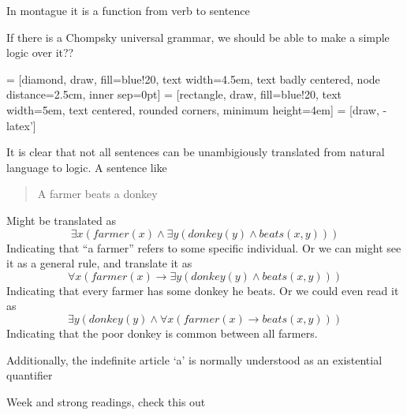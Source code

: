 \documentclass[12pt]{article}
\begin{document}
In montague it is a function from verb to sentence

If there is a Chompsky universal grammar, we should be able to make a simple logic over it??

 = [diamond, draw, fill=blue!20,
    text width=4.5em, text badly centered, node distance=2.5cm, inner sep=0pt]
 = [rectangle, draw, fill=blue!20,
    text width=5em, text centered, rounded corners, minimum height=4em]
 = [draw, -latex']
    

It is clear that not all sentences can be unambigiously translated from natural language to logic. A sentence like 	
\begin{quotation}
A farmer beats a donkey
\end{quotation}
Might be translated as 
\begin{equation}
\exists x ( farmer(x) \wedge \exists y ( donkey(y) \wedge beats(x,y)))
\end{equation}
Indicating that ``a farmer'' refers to some specific individual. Or we can might see it as a general rule, and translate it as
\begin{equation}
\forall x ( farmer(x) \rightarrow \exists y ( donkey(y) \wedge beats(x,y)))
\end{equation}
Indicating that every farmer has some donkey he beats. Or we could even read it as
\begin{equation}
\exists y ( donkey(y) \wedge \forall x ( farmer(x) \rightarrow beats(x,y)))
\end{equation}
Indicating that the poor donkey is common between all farmers.

Additionally, the indefinite article `a' is normally understood as an existential quantifier

Week and strong readings, check this out \cite{kanazawa1994weak}
\end{document}
